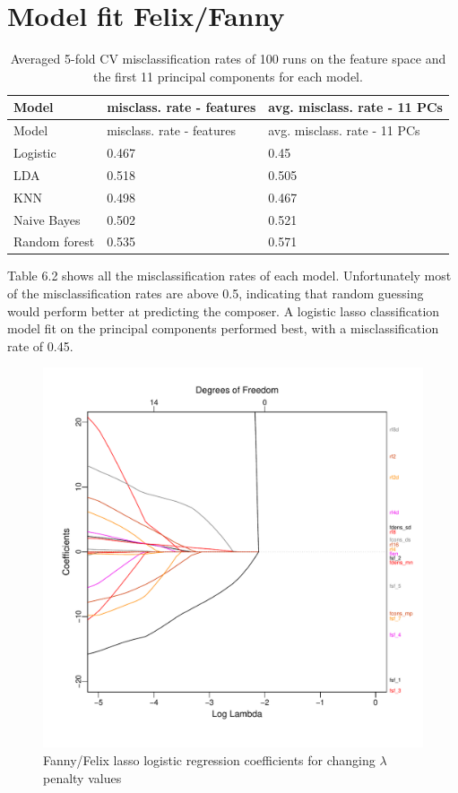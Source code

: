 \documentclass[12pt,twoside]{reedthesis}
\theoremstyle{definition}
\theoremstyle{definition}
\theoremstyle{definition}
\theoremstyle{remark}
\begin{document}
\section{Model fit Felix/Fanny}\label{model-fit-felixfanny}
\begin{longtable}[]{@{}lll@{}}
\caption{Averaged 5-fold CV misclassification rates of 100 runs on the
feature space and the first 11 principal components for each
model.}\tabularnewline
\toprule
Model & misclass. rate - features & avg. misclass. rate - 11
PCs\tabularnewline
\midrule
\endfirsthead
\toprule
Model & misclass. rate - features & avg. misclass. rate - 11
PCs\tabularnewline
\midrule
\endhead
Logistic & 0.467 & 0.45\tabularnewline
LDA & 0.518 & 0.505\tabularnewline
KNN & 0.498 & 0.467\tabularnewline
Naive Bayes & 0.502 & 0.521\tabularnewline
Random forest & 0.535 & 0.571\tabularnewline
\bottomrule
\end{longtable}
Table 6.2 shows all the misclassification rates of each model.
Unfortunately most of the misclassification rates are above 0.5,
indicating that random guessing would perform better at predicting the
composer. A logistic lasso classification model fit on the principal
components performed best, with a misclassification rate of 0.45.
\begin{figure}[H]
\centering
\includegraphics[scale = .6]{images/loglambda_f.pdf}
\caption{Fanny/Felix lasso logistic regression coefficients for changing $\lambda$ penalty values}
\label{subd}
\end{figure}
\end{document}
